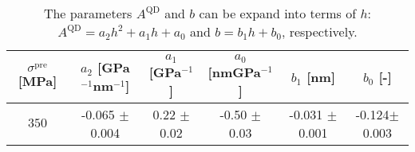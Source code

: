  		
 		
 		\begin{table}[ht!]
 			\centering
 			\caption{The parameters $A^\mathrm{QD}$ and $b$ can be expand into terms of $h$: $A^\mathrm{QD}=a_2h^2+a_1h+a_0$ and $b=b_1h+b_0$, respectively.}
 			\label{tab:height_fit}
 			\begin{tabular}{|c|c|c|c||c|c|}
 				\hline
 				 $\sigma^\mathrm{pre}$ [MPa]		& $a_2$ [GPa$^{-1}$nm$^{-1}$]    & $a_1$   [GPa$^{-1}$]  &$a_0$ [nmGPa$^{-1}$] & $b_1$ [nm] & $b_0$ [-] \\ \hline
 				$350$  &-0.065 $\pm$ 0.004  & 0.22 $\pm$ 0.02  &  -0.50 $\pm$ 0.03 & -0.031 $\pm$ 0.001 & -0.124$\pm$0.003 \\ \hline
 			\end{tabular}    
 		\end{table}
 		

